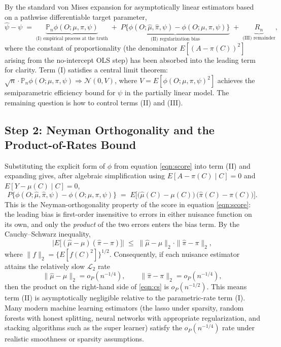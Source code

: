 \documentclass[12pt]{article}
\newcommand{\Pn}{\mathbb{P}_n}
\begin{document}
By the standard von Mises expansion for asymptotically linear estimators based on a pathwise differentiable target parameter,\cite{Chernozhukov2018, Kennedy2024}
\begin{equation}
\hat{\psi} - \psi \;=\; \underbrace{\Pn \phi(O; \mu, \pi, \psi)}_{\text{(I)\ empirical process at the truth}} \;+\; \underbrace{P\{\phi(O; \hat{\mu}, \hat{\pi}, \psi) - \phi(O; \mu, \pi, \psi)\}}_{\text{(II)\ regularization bias}} \;+\; \underbrace{R_n}_{\text{(III)\ remainder}}, \label{eqn:vm}
\end{equation}
where the constant of proportionality (the denominator $E[(A - \pi(C))^2]$ arising from the no-intercept OLS step) has been absorbed into the leading term for clarity. Term (I) satisfies a central limit theorem: $\sqrt{n} \cdot \Pn \phi(O; \mu, \pi, \psi) \Rightarrow \mathcal{N}(0, V)$, where $V = E[\phi(O; \mu, \pi, \psi)^2]$ achieves the semiparametric efficiency bound for $\psi$ in the partially linear model.\cite{Robinson1988, Chernozhukov2018} The remaining question is how to control terms (II) and (III).

\subsection{Step 2: Neyman Orthogonality and the Product-of-Rates Bound}

Substituting the explicit form of $\phi$ from equation \ref{eqn:score} into term (II) and expanding gives, after algebraic simplification using $E[A - \pi(C) \mid C] = 0$ and $E[Y - \mu(C) \mid C] = 0$,
\begin{equation}
P\big\{\phi(O; \hat{\mu}, \hat{\pi}, \psi) - \phi(O; \mu, \pi, \psi)\big\} \;=\; E\Big[\big(\hat{\mu}(C) - \mu(C)\big)\,\big(\hat{\pi}(C) - \pi(C)\big)\Big]. \label{eqn:orthog}
\end{equation}
This is the Neyman-orthogonality property of the score in equation \ref{eqn:score}: the leading bias is first-order insensitive to errors in either nuisance function on its own, and only the \emph{product} of the two errors enters the bias term. By the Cauchy--Schwarz inequality,
\begin{equation}
\big|E\big[(\hat{\mu} - \mu)(\hat{\pi} - \pi)\big]\big| \;\leq\; \|\hat{\mu} - \mu\|_2 \cdot \|\hat{\pi} - \pi\|_2, \label{eqn:cs}
\end{equation}
where $\|f\|_2 = \{E[f(C)^2]\}^{1/2}$. Consequently, if each nuisance estimator attains the relatively slow $\mathcal{L}_2$ rate
$$\|\hat{\mu} - \mu\|_2 = o_P(n^{-1/4}), \qquad \|\hat{\pi} - \pi\|_2 = o_P(n^{-1/4}),$$
then the product on the right-hand side of \ref{eqn:cs} is $o_P(n^{-1/2})$. This means term (II) is asymptotically negligible relative to the parametric-rate term (I). Many modern machine learning estimators (the lasso under sparsity, random forests with honest splitting, neural networks with appropriate regularization, and stacking algorithms such as the super learner) satisfy the $o_P(n^{-1/4})$ rate under realistic smoothness or sparsity assumptions.\cite{Chernozhukov2018, Kennedy2024}
\end{document}
